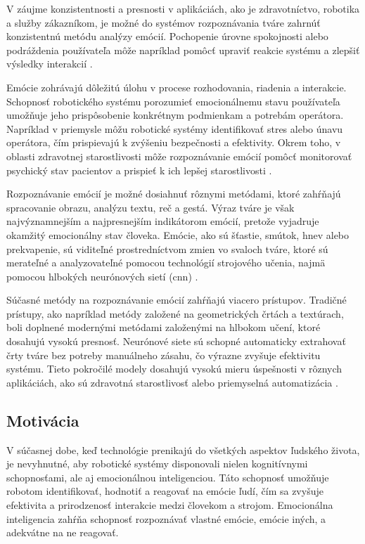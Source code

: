 V záujme konzistentnosti a presnosti v aplikáciách, ako je zdravotníctvo, robotika a služby zákazníkom, je možné do systémov rozpoznávania tváre zahrnúť konzistentnú metódu analýzy emócií. 
Pochopenie úrovne spokojnosti alebo podráždenia používateľa môže napríklad pomôcť upraviť reakcie systému a zlepšiť výsledky interakcií \cite{article06}.

Emócie zohrávajú dôležitú úlohu v procese rozhodovania, riadenia a interakcie. Schopnosť robotického systému porozumieť emocionálnemu stavu používateľa umožňuje jeho prispôsobenie konkrétnym podmienkam a 
potrebám operátora. Napríklad v priemysle môžu robotické systémy identifikovať stres alebo únavu operátora, čím prispievajú k zvýšeniu bezpečnosti a efektivity. Okrem toho, v oblasti zdravotnej starostlivosti 
môže rozpoznávanie emócií pomôcť monitorovať psychický stav pacientov a prispieť k ich lepšej starostlivosti \cite{article03}. 

Rozpoznávanie emócií je možné dosiahnuť rôznymi metódami, ktoré zahŕňajú spracovanie obrazu, analýzu textu, reč a gestá. Výraz tváre je však najvýznamnejším a najpresnejším indikátorom emócií, 
pretože vyjadruje okamžitý emocionálny stav človeka. Emócie, ako sú šťastie, smútok, hnev alebo prekvapenie, sú viditeľné prostredníctvom zmien vo svaloch tváre, ktoré sú merateľné a analyzovateľné 
pomocou technológií strojového učenia, najmä pomocou hlbokých neurónových sietí (\gls{cnn}) \cite{article04}.

Súčasné metódy na rozpoznávanie emócií zahŕňajú viacero prístupov. Tradičné prístupy, ako napríklad metódy založené na geometrických črtách a textúrach, boli doplnené modernými metódami založenými 
na hlbokom učení, ktoré dosahujú vysokú presnosť. Neurónové siete sú schopné automaticky extrahovať črty tváre bez potreby manuálneho zásahu, čo výrazne zvyšuje efektivitu systému. Tieto pokročilé 
modely dosahujú vysokú mieru úspešnosti v rôznych aplikáciách, ako sú zdravotná starostlivosť alebo priemyselná automatizácia \cite{article03} \cite{book01}.

\subsection{Motivácia}
V súčasnej dobe, keď technológie prenikajú do všetkých aspektov ľudského života, je nevyhnutné, aby robotické systémy disponovali nielen kognitívnymi schopnosťami, ale aj emocionálnou inteligenciou. 
Táto schopnosť umožňuje robotom identifikovať, hodnotiť a reagovať na emócie ľudí, čím sa zvyšuje efektivita a prirodzenosť interakcie medzi človekom a strojom. Emocionálna inteligencia zahŕňa schopnosť 
rozpoznávať vlastné emócie, emócie iných, a adekvátne na ne reagovať.

